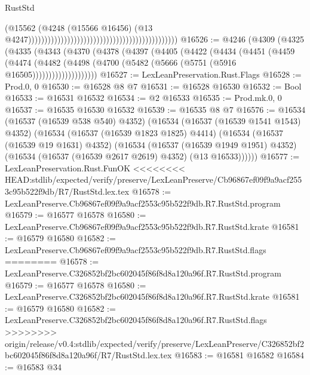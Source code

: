 \begin{lexlean}{RustStd}
\begin{coremodule}
{\begin{coremodule}
{{{{{{{{{{{{{{{{{{{{{{{{{{{{{{{{{{{{{{{{{{{{{{{{{{{{{{{                                                                                          (@15562
                                                                                            (@4248
                                                                                              (@15566
                                                                                                @16456)
                                                                                              (@13
                                                                                                @4247))))))))))))))))))))))))))))))))))))))))))))))
@16526 := @4246
    (@4309
      (@4325
        (@4335
          (@4343
            (@4370
              (@4378
                (@4397
                  (@4405
                    (@4422
                      (@4434
                        (@4451
                          (@4459
                            (@4474
                              (@4482
                                (@4498 (@4700 (@5482 (@5666 (@5751 (@5916 @16505))))))))))))))))))))
@16527 := LexLeanPreservation.Rust.Flags
@16528 := Prod.{0, 0}
@16530 := @16528 @8 @7
@16531 := @16528 @16530
@16532 := Bool
@16533 := @16531 @16532
@16534 := @2 @16533
@16535 := Prod.mk.{0, 0}
@16537 := @16535 @16530 @16532
@16539 := @16535 @8 @7
@16576 := @16534
    (@16537 (@16539 @538 @540) @4352)
    (@16534
      (@16537 (@16539 @1541 @1543) @4352)
      (@16534
        (@16537 (@16539 @1823 @1825) @4414)
        (@16534
          (@16537 (@16539 @19 @1631) @4352)
          (@16534
            (@16537 (@16539 @1949 @1951) @4352)
            (@16534 (@16537 (@16539 @2617 @2619) @4352) (@13 @16533))))))
@16577 := LexLeanPreservation.Rust.FunOK
<<<<<<<< HEAD:stdlib/expected/verify/preserve/LexLeanPreserve/Cb96867ef09f9a9acf2553c95b522f9db/R7/RustStd.lex.tex
@16578 := LexLeanPreserve.Cb96867ef09f9a9acf2553c95b522f9db.R7.RustStd.program
@16579 := @16577 @16578
@16580 := LexLeanPreserve.Cb96867ef09f9a9acf2553c95b522f9db.R7.RustStd.krate
@16581 := @16579 @16580
@16582 := LexLeanPreserve.Cb96867ef09f9a9acf2553c95b522f9db.R7.RustStd.flags
========
@16578 := LexLeanPreserve.C326852bf2bc602045f86f8d8a120a96f.R7.RustStd.program
@16579 := @16577 @16578
@16580 := LexLeanPreserve.C326852bf2bc602045f86f8d8a120a96f.R7.RustStd.krate
@16581 := @16579 @16580
@16582 := LexLeanPreserve.C326852bf2bc602045f86f8d8a120a96f.R7.RustStd.flags
>>>>>>>> origin/release/v0.4:stdlib/expected/verify/preserve/LexLeanPreserve/C326852bf2bc602045f86f8d8a120a96f/R7/RustStd.lex.tex
@16583 := @16581 @16582
@16584 := @16583 @34
}}}}}}}}}}}}}}}}}}}}}}}}}}}}}}}}}}}}}}}}}}}}}}}}}}}}}}}
\end{coremodule}}
\end{coremodule}
\end{lexlean}
